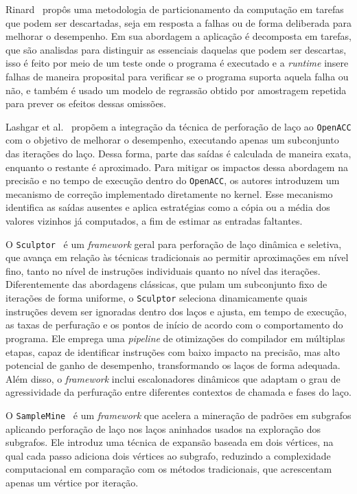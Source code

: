 Rinard~\cite{rinard2006} propôs uma metodologia de particionamento da computação em tarefas que podem ser descartadas, seja em resposta a falhas ou de forma deliberada para melhorar o desempenho. Em sua abordagem a aplicação é decomposta em tarefas, que são analisdas para distinguir as essenciais daquelas que podem ser descartas, isso é feito por meio de um teste onde o programa é executado e a \textit{runtime} insere falhas de maneira proposital para verificar se o programa suporta aquela falha ou não, e também é usado um modelo de regrassão obtido por amostragem repetida para prever os efeitos dessas omissões.

Lashgar et al.~\cite{lashgar2018} propõem a integração da técnica de perforação de laço ao \texttt{OpenACC} com o objetivo de melhorar o desempenho, executando apenas um subconjunto das iterações do laço. Dessa forma, parte das saídas é calculada de maneira exata, enquanto o restante é aproximado. Para mitigar os impactos dessa abordagem na precisão e no tempo de execução dentro do \texttt{OpenACC}, os autores introduzem um mecanismo de correção implementado diretamente no kernel. Esse mecanismo identifica as saídas ausentes e aplica estratégias como a cópia ou a média dos valores vizinhos já computados, a fim de estimar as entradas faltantes.

O \texttt{Sculptor}~\cite{li2018} é um \textit{framework} geral para perforação de laço dinâmica e seletiva, que avança em relação às técnicas tradicionais ao permitir aproximações em nível fino, tanto no nível de instruções individuais quanto no nível das iterações. Diferentemente das abordagens clássicas, que pulam um subconjunto fixo de iterações de forma uniforme, o \texttt{Sculptor} seleciona dinamicamente quais instruções devem ser ignoradas dentro dos laços e ajusta, em tempo de execução, as taxas de perfuração e os pontos de início de acordo com o comportamento do programa. Ele emprega uma \textit{pipeline} de otimizações do compilador em múltiplas etapas, capaz de identificar instruções com baixo impacto na precisão, mas alto potencial de ganho de desempenho, transformando os laços de forma adequada. Além disso, o \textit{framework} inclui escalonadores dinâmicos que adaptam o grau de agressividade da perfuração entre diferentes contextos de chamada e fases do laço.

O \texttt{SampleMine}~\cite{jiang2022} é um \textit{framework} que acelera a mineração de padrões em subgrafos aplicando perforação de laço nos laços aninhados usados na exploração dos subgrafos. Ele introduz uma técnica de expansão baseada em dois vértices, na qual cada passo adiciona dois vértices ao subgrafo, reduzindo a complexidade computacional em comparação com os métodos tradicionais, que acrescentam apenas um vértice por iteração.

